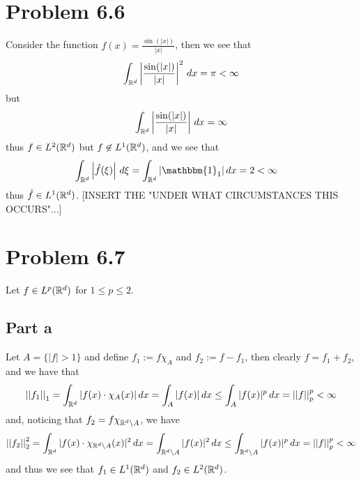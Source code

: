 \documentclass[12pt]{report}
\newcommand{\norm}[1]{\left|\left|#1\right|\right|}
\begin{document}
\maketitle

\section*{Problem 6.6}
Consider the function $f(x) = \frac{\sin(|x|)}{|x|}$, then we see that
\begin{equation*}
    \int_{\mathbb{R}^d} \left|\frac{\sin(|x|)}{|x|}\right|^2 \, dx  = \pi < \infty
\end{equation*}
but 
\begin{equation*}
    \int_{\mathbb{R}^d} \left|\frac{\sin(|x|)}{|x|}\right| \, dx = \infty
\end{equation*}
thus $f \in L^2(\mathbb{R}^d)$ but $f \not\in L^1(\mathbb{R}^d)$, and we see that
\begin{align*}
    \int_{\R^d} \left|\hat{f}(\xi)\right| \, d\xi &= \int_{\R^d} |\mathbbm{1}_1| \,dx = 2 < \infty
\end{align*}
thus $\hat{f} \in L^1(\mathbb{R}^d)$. [INSERT THE "UNDER WHAT CIRCUMSTANCES THIS OCCURS"...]

\section*{Problem 6.7}
Let $f \in L^p(\mathbb{R}^d)$ for $1 \leq p \leq 2$.
\subsection*{Part a}
Let $A = \{|f| > 1\}$ and define $f_1 := f\chi_A$  and $f_2:= f - f_1$, then clearly $f = f_1 + f_2$, and we have that 
\begin{equation*}
    \norm{f_1}_1 = \int_{\R^d} |f(x) \cdot \chi_A(x)| \, dx = \int_A |f(x)| \, dx \leq \int_A |f(x)|^p \, dx = \norm{f}_p^p < \infty
\end{equation*}
and, noticing that $f_2 = f\chi_{\mathbb{R}^d \setminus A}$, we have 
\begin{equation*}
    \norm{f_2}_2^2 = \int_{\R^d} |f(x) \cdot \chi_{\R^d \setminus A}(x)|^2 \, dx = \int_{\R^d \setminus A} |f(x)|^2 \, dx \leq \int_{\R^d \setminus A} |f(x)|^p \, dx = \norm{f}_p^p < \infty
\end{equation*}
and thus we see that $f_1 \in L^1(\mathbb{R}^d)$ and $f_2 \in L^2(\mathbb{R}^d)$.
\end{document}
